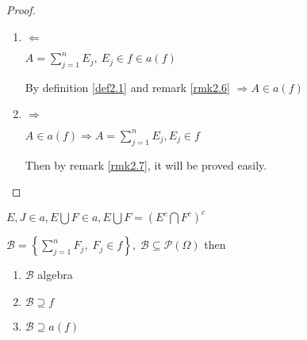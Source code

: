\begin{proof}
	\text{}
	\begin{enumerate}
		\item $ \Leftarrow $ 
		
		$A = \sum\limits_{j = 1}^n {{E_j}} , \ {E_j} \in f \in a \left(f\right)$
		
		By definition \ref{def2.1} and remark \ref{rmk2.6} $ \Rightarrow A \in a \left(f\right) $
		\item $ \Rightarrow $
		
		$ A \in a\left(f\right) \Rightarrow A = \sum\limits_{j = 1}^n {{E_j}} ,{E_j} \in f $
		
		Then by remark \ref{rmk2.7}, it will be  proved easily.
	\end{enumerate}
\end{proof}

\begin{remark}
	$ E,J \in a, E \bigcup F \in a, E \bigcup F= \left(E^{c} \bigcap F^{c}\right)^{c} $
	\label{rmk2.6}
\end{remark}

\begin{remark}
	$ \mathcal{B} =\left\{ {\sum\limits_{j = 1}^n {{F_j},\;{F_j} \in f} } \right\},\;\mathcal{B} \subseteq \mathcal{P}\left( \Omega  \right) $ then
	\begin{enumerate}
		\item $ \mathcal{B} $ algebra
		\item $ \mathcal{B} \supseteq f $
		\item $ \mathcal{B} \supseteq a\left(f\right) $
	\end{enumerate} 
	\label{rmk2.7}
\end{remark}

